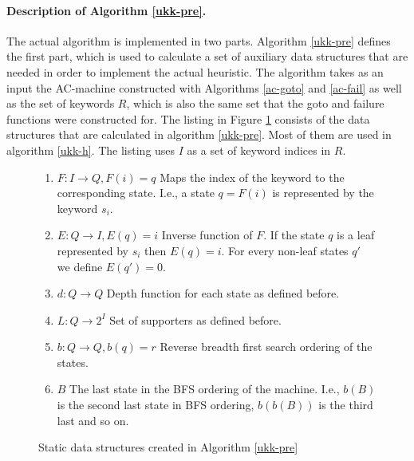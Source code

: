 \documentclass[english,twoside,censored,csm,algorithms-track-2020]{HYthesisML}
\theoremstyle{plain}
\theoremstyle{definition}
\begin{document}
\paragraph{Description of Algorithm \ref{ukk-pre}.}
The actual algorithm is implemented in two parts. Algorithm \ref{ukk-pre} defines the first part,
which is used to calculate a set of auxiliary data structures that are needed in order to implement
the actual heuristic. The algorithm takes as an input the AC-machine constructed with
Algorithms \ref{ac-goto} and \ref{ac-fail} as well as the set of keywords $R$, which is also
the same set that the goto and failure functions were constructed for. 
The listing in Figure \ref{lst-auxiliary-data} consists of the data structures that are calculated
in algorithm \ref{ukk-pre}. Most of them are used in algorithm \ref{ukk-h}. The listing uses $I$ as
a set of keyword indices in $R$.

\begin{figure}[hb]
\begin{enumerate}
  \item $F : I \rightarrow Q, F(i)=q$ Maps the index of the keyword to the corresponding state. I.e., a state $q=F(i)$ is represented by the keyword $s_i$.
  \item $E : Q \rightarrow I, E(q)=i$ Inverse function of $F$. If the state $q$ is a leaf represented by $s_i$ then $E(q)=i$. For every non-leaf states $q'$ we define $E(q')=0$.
  \item $d : Q \rightarrow Q$ Depth function for each state as defined before.
  \item $L : Q \rightarrow 2^{I}$ Set of supporters as defined before.
  \item $b : Q \rightarrow Q, b(q)=r$ Reverse breadth first search ordering of the states.
  \item $B$ The last state in the BFS ordering of the machine. I.e., $b(B)$ is the second last state in BFS ordering, $b(b(B))$ is the third last and so on.
\end{enumerate}
\caption{Static data structures created in Algorithm \ref{ukk-pre}} \label{lst-auxiliary-data}
\end{figure}
\end{document}
